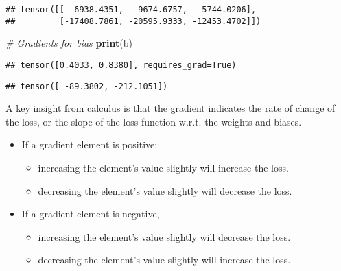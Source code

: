 \documentclass[]{book}
\newenvironment{Shaded}{\begin{snugshade}}{\end{snugshade}}
\newcommand{\CommentTok}[1]{\textcolor[rgb]{0.56,0.35,0.01}{\textit{#1}}}
\newcommand{\KeywordTok}[1]{\textcolor[rgb]{0.13,0.29,0.53}{\textbf{#1}}}
\newcommand{\NormalTok}[1]{#1}
\newcommand{\OperatorTok}[1]{\textcolor[rgb]{0.81,0.36,0.00}{\textbf{#1}}}
\providecommand{\tightlist}{%
  \setlength{\itemsep}{0pt}\setlength{\parskip}{0pt}}
\begin{document}
\begin{verbatim}
## tensor([[ -6938.4351,  -9674.6757,  -5744.0206],
##         [-17408.7861, -20595.9333, -12453.4702]])
\end{verbatim}

\begin{Shaded}
\begin{Highlighting}[]
\CommentTok{# Gradients for bias}
\KeywordTok{print}\NormalTok{(b)}
\end{Highlighting}
\end{Shaded}

\begin{verbatim}
## tensor([0.4033, 0.8380], requires_grad=True)
\end{verbatim}

\begin{Shaded}
\end{Shaded}

\begin{verbatim}
## tensor([ -89.3802, -212.1051])
\end{verbatim}

A key insight from calculus is that the gradient indicates the rate of change of the loss, or the slope of the loss function w.r.t. the weights and biases.

\begin{itemize}
\tightlist
\item
  If a gradient element is positive:

  \begin{itemize}
  \tightlist
  \item
    increasing the element's value slightly will increase the loss.
  \item
    decreasing the element's value slightly will decrease the loss.
  \end{itemize}
\item
  If a gradient element is negative,

  \begin{itemize}
  \tightlist
  \item
    increasing the element's value slightly will decrease the loss.
  \item
    decreasing the element's value slightly will increase the loss.
  \end{itemize}
\end{itemize}
\end{document}
